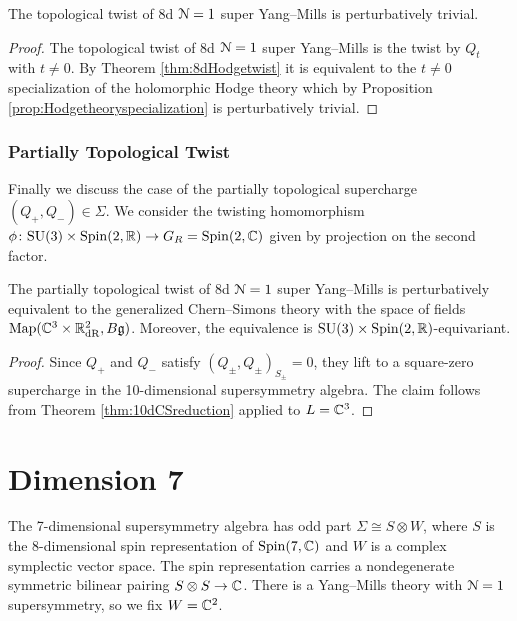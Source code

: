\documentclass[10pt, oneside]{article}
\begin{document}
\begin{corollary}
The topological twist of 8d $\mathcal N=1$ super Yang--Mills is perturbatively trivial.
\label{cor:8dtopologicaltwist}
\end{corollary}
\begin{proof}
The topological twist of 8d $\mathcal N=1$ super Yang--Mills is the twist by $Q_t$ with $t\neq 0$. By Theorem \ref{thm:8dHodgetwist} it is equivalent to the $t\neq 0$ specialization of the holomorphic Hodge theory which by Proposition \ref{prop:Hodgetheoryspecialization} is perturbatively trivial.
\end{proof}

\subsubsection{Partially Topological Twist}
\label{sect:8dpartiallytopologicaltwist}

Finally we discuss the case of the partially topological supercharge $(Q_+, Q_-)\in\Sigma$. We consider the twisting homomorphism $\phi\colon \mathrm{SU}(3)\times \mathrm{Spin}(2, \mathbb R)\rightarrow G_R=\mathrm{Spin}(2, \mathbb C)$ given by projection on the second factor.

\begin{theorem}
The partially topological twist of 8d $\mathcal N=1$ super Yang--Mills is perturbatively equivalent to the generalized Chern--Simons theory with the space of fields $\operatorname{Map}(\mathbb C^3\times \mathbb R^2_{\mathrm{dR}}, B\mathfrak g)$. Moreover, the equivalence is $\mathrm{SU}(3)\times \mathrm{Spin}(2, \mathbb R)$-equivariant.
\label{thm:8dpartiallytopologicaltwist}
\end{theorem}
\begin{proof}
Since $Q_+$ and $Q_-$ satisfy $(Q_\pm, Q_\pm)_{S_\pm} = 0$, they lift to a square-zero supercharge in the 10-dimensional supersymmetry algebra. The claim follows from Theorem \ref{thm:10dCSreduction} applied to $L=\mathbb C^3$.
\end{proof}

\section{Dimension 7} \label{7d_section}

The 7-dimensional supersymmetry algebra has odd part $\Sigma\cong S\otimes W$, where $S$ is the 8-dimensional spin representation of $\mathrm{Spin}(7, \mathbb C)$ and $W$ is a complex symplectic vector space.  The spin representation carries a nondegenerate symmetric bilinear pairing $S\otimes S\rightarrow \mathbb C$. There is a Yang--Mills theory with $\mathcal{N}=1$ supersymmetry, so we fix $W = \mathbb C^2$.
\end{document}
